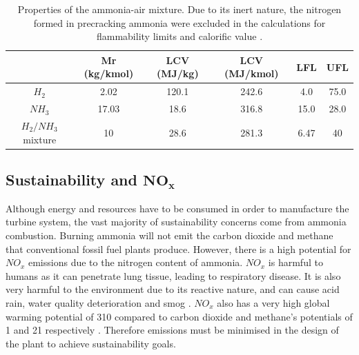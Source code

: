 \begin{table} [h]
\begin{center}
\caption{Properties of the ammonia-air mixture. Due to its inert nature, the nitrogen formed in precracking ammonia were excluded in the calculations for flammability limits and calorific value \cite{FL}.} \label{tab:mixproperties}
\begin{tabular}{ |c|c|c|c|c|c| }
 \hline
& Mr (kg/kmol) & LCV (MJ/kg) \cite{website:spg}& LCV (MJ/kmol) & LFL & UFL\\ 
 \hline
  $H_2$ & 2.02 & 120.1 & 242.6 & 4.0 & 75.0\\ 
 \hline
$NH_3$ & 17.03 & 18.6 & 316.8 & 15.0 & 28.0\\ 
 \hline
$H_2/NH_3$ mixture & 10 & 28.6 & 281.3 & 6.47 & 40\\
 \hline
\end{tabular}
\end{center} 
\end{table}

\subsection{Sustainability and $\mathbf{NO_x}$} \label{ssec:NOx}
Although energy and resources have to be consumed in order to manufacture the turbine system, the vast majority of sustainability concerns come from ammonia combustion. Burning ammonia will not emit the carbon dioxide and methane that conventional fossil fuel plants produce. However,  there is a high potential for $NO_x$ emissions due to the nitrogen content of ammonia. $NO_x$ is harmful to humans as it can penetrate lung tissue, leading to respiratory disease. It is also very harmful to the environment due to its reactive nature, and can cause acid rain, water quality deterioration and smog \cite{NOxeffect}. $NO_x$ also has a very high global warming potential of 310 compared to carbon dioxide and methane's potentials of 1 and 21 respectively \cite{website:NOXGWP}. Therefore emissions must be minimised in the design of the plant to achieve sustainability goals.  %

